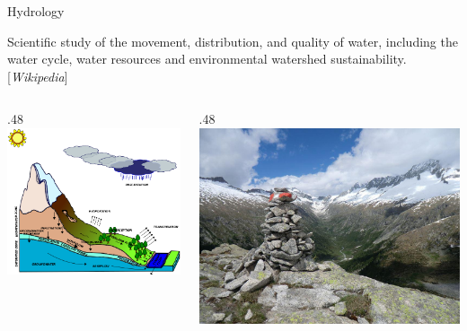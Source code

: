 \documentclass[ignorenonframetext,]{beamer}
\def\begincols{\begin{columns}}
\def\begincol{\begin{column}}
\def\endcol{\end{column}}
\def\endcols{\end{columns}}
\begin{document}
\begin{frame}{Hydrology}

Scientific study of the movement, distribution, and quality of water,
including the water cycle, water resources and environmental watershed
sustainability.{[}\emph{Wikipedia}{]} \begincols
\begincol{.48\textwidth}
\includegraphics[width=1.00000\textwidth]{resources/images/geotop_landscape.png}\\
\endcol
\begincol{.48\textwidth}
\includegraphics[width=1.00000\textwidth]{resources/images/valdifumo.jpg}\\
\endcol
\endcols

\end{frame}
\end{document}
